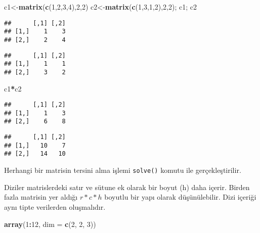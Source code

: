 \documentclass[
]{book}
\newenvironment{Shaded}{\begin{snugshade}}{\end{snugshade}}
\newcommand{\DataTypeTok}[1]{\textcolor[rgb]{0.13,0.29,0.53}{#1}}
\newcommand{\DecValTok}[1]{\textcolor[rgb]{0.00,0.00,0.81}{#1}}
\newcommand{\KeywordTok}[1]{\textcolor[rgb]{0.13,0.29,0.53}{\textbf{#1}}}
\newcommand{\NormalTok}[1]{#1}
\newcommand{\OperatorTok}[1]{\textcolor[rgb]{0.81,0.36,0.00}{\textbf{#1}}}
\begin{document}
\begin{Shaded}
\begin{Highlighting}[]
\NormalTok{c1<-}\KeywordTok{matrix}\NormalTok{(}\KeywordTok{c}\NormalTok{(}\DecValTok{1}\NormalTok{,}\DecValTok{2}\NormalTok{,}\DecValTok{3}\NormalTok{,}\DecValTok{4}\NormalTok{),}\DecValTok{2}\NormalTok{,}\DecValTok{2}\NormalTok{)}
\NormalTok{c2<-}\KeywordTok{matrix}\NormalTok{(}\KeywordTok{c}\NormalTok{(}\DecValTok{1}\NormalTok{,}\DecValTok{3}\NormalTok{,}\DecValTok{1}\NormalTok{,}\DecValTok{2}\NormalTok{),}\DecValTok{2}\NormalTok{,}\DecValTok{2}\NormalTok{); c1; c2}
\end{Highlighting}
\end{Shaded}

\begin{verbatim}
##      [,1] [,2]
## [1,]    1    3
## [2,]    2    4
\end{verbatim}

\begin{verbatim}
##      [,1] [,2]
## [1,]    1    1
## [2,]    3    2
\end{verbatim}

\begin{Shaded}
\begin{Highlighting}[]
\NormalTok{c1}\OperatorTok{*}\NormalTok{c2}
\end{Highlighting}
\end{Shaded}

\begin{verbatim}
##      [,1] [,2]
## [1,]    1    3
## [2,]    6    8
\end{verbatim}

\begin{Shaded}
\end{Shaded}

\begin{verbatim}
##      [,1] [,2]
## [1,]   10    7
## [2,]   14   10
\end{verbatim}

Herhangi bir matrisin tersini alma işlemi \texttt{solve()} komutu ile gerçekleştirilir.

Diziler matrislerdeki satır ve sütune ek olarak bir boyut (h) daha içerir. Birden fazla matrisin yer aldığı \(r*c*h\) boyutlu bir yapı olarak düşünülebilir. Dizi içeriği aynı tipte verilerden oluşmalıdır.

\begin{Shaded}
\begin{Highlighting}[]
\KeywordTok{array}\NormalTok{(}\DecValTok{1}\OperatorTok{:}\DecValTok{12}\NormalTok{, }\DataTypeTok{dim =} \KeywordTok{c}\NormalTok{(}\DecValTok{2}\NormalTok{, }\DecValTok{2}\NormalTok{, }\DecValTok{3}\NormalTok{))}
\end{Highlighting}
\end{Shaded}
\end{document}
